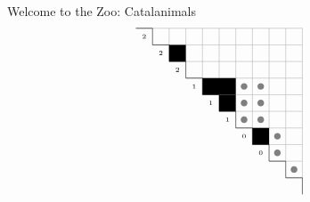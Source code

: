 \documentclass{beamer}
\newcounter{c}
\begin{document}
\begin{frame}{Welcome to the Zoo: Catalanimals}
\[\begin{array}{@{\hspace{0.2mm}}c@{\quad\quad}cr}
\begin{tikzpicture}[scale = .47]
\begin{scope}
\draw[draw = none, fill = gray!100] (7+0.5, -4-0.5) circle (.2);
\draw[draw = none, fill = gray!100] (8+0.5, -4-0.5) circle (.2);
\draw[draw = none, fill = gray!100] (7+0.5, -5-0.5) circle (.2);
\draw[draw = none, fill = gray!100] (8+0.5, -5-0.5) circle (.2);
\draw[draw = none, fill = gray!100] (7+0.5, -6-0.5) circle (.2);
\draw[draw = none, fill = gray!100] (8+0.5, -6-0.5) circle (.2);
\draw[draw = none, fill = gray!100] (9+0.5, -7-0.5) circle (.2);
\draw[draw = none, fill = gray!100] (9+0.5, -8-0.5) circle (.2);
\draw[draw = none, fill = gray!100] (10+0.5, -9-0.5) circle (.2);
\draw[thin, black!31] (1,-1) -- (11,-1);
\draw[thin, black!31] (2,-1) -- (2,-1);
\draw[thin, black!31] (2,-2) -- (11,-2);
\draw[thin, black!31] (3,-2) -- (3,-1);
\draw[thin, black!31] (3,-3) -- (11,-3);
\draw[thin, black!31] (4,-3) -- (4,-1);
\draw[thin, black!31] (4,-4) -- (11,-4);
\draw[thin, black!31] (5,-4) -- (5,-1);
\draw[thin, black!31] (5,-5) -- (11,-5);
\draw[thin, black!31] (6,-5) -- (6,-1);
\draw[thin, black!31] (6,-6) -- (11,-6);
\draw[thin, black!31] (7,-6) -- (7,-1);
\draw[thin, black!31] (7,-7) -- (11,-7);
\draw[thin, black!31] (8,-7) -- (8,-1);
\draw[thin, black!31] (8,-8) -- (11,-8);
\draw[thin, black!31] (9,-8) -- (9,-1);
\draw[thin, black!31] (9,-9) -- (11,-9);
\draw[thin, black!31] (10,-9) -- (10,-1);
\draw[thin, black!31] (10,-10) -- (11,-10);
\draw[thin, black!31] (11,-10) -- (11,-1);
\draw[draw = none, fill = black!100] (3,-2) rectangle (4,-3);
 \draw[draw = none, fill = black!100] (5,-4) rectangle (6,-5);
 \draw[draw = none, fill = black!100] (6,-4) rectangle (7,-5);
 \draw[draw = none, fill = black!100] (6,-5) rectangle (7,-6);
 \draw[draw = none, fill = black!100] (8,-7) rectangle (9,-8);
 \draw[thin] (1,-1) -- (2,-1);
\draw[thin] (2,-1) -- (2,-2);
\draw[thin] (2,-2) -- (3,-2);
\draw[thin] (3,-2) -- (3,-3);
\draw[thin] (3,-3) -- (4,-3);
\draw[thin] (4,-3) -- (4,-4);
\draw[thin] (4,-4) -- (5,-4);
\draw[thin] (5,-4) -- (5,-5);
\draw[thin] (5,-5) -- (6,-5);
\draw[thin] (6,-5) -- (6,-6);
\draw[thin] (6,-6) -- (7,-6);
\draw[thin] (7,-6) -- (7,-7);
\draw[thin] (7,-7) -- (8,-7);
\draw[thin] (8,-7) -- (8,-8);
\draw[thin] (8,-8) -- (9,-8);
\draw[thin] (9,-8) -- (9,-9);
\draw[thin] (9,-9) -- (10,-9);
\draw[thin] (10,-9) -- (10,-10);
\draw[thin] (10,-10) -- (11,-10);
\draw[thin] (11,-10) -- (11,-11);
\node at (3/2,-3/2) {\tiny $2 $};
\node at (5/2,-5/2) {\tiny $2 $};
\node at (7/2,-7/2) {\tiny $2 $};
\node at (9/2,-9/2) {\tiny $1 $};
\node at (11/2,-11/2) {\tiny $1 $};
\node at (13/2,-13/2) {\tiny $1 $};
\node at (15/2,-15/2) {\tiny $0 $};
\node at (17/2,-17/2) {\tiny $0 $};

\end{scope}
\end{tikzpicture}
\end{array}\]
\end{frame}
\end{document}
